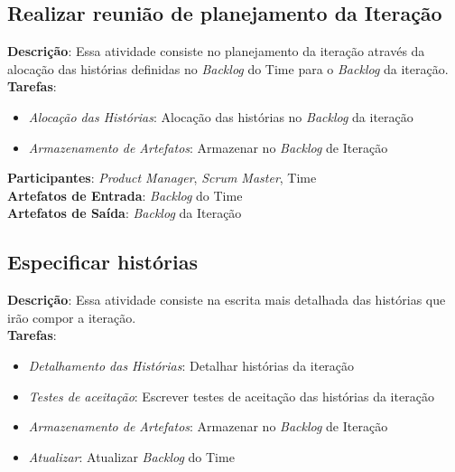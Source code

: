 \subsection{Realizar reunião de planejamento da Iteração}
  \textbf{Descrição}: Essa atividade consiste no planejamento da iteração através da alocação das histórias definidas no \textit{Backlog} do Time para o \textit{Backlog} da iteração. \\

  \textbf{Tarefas}:
  \begin{itemize}
   \item \indent \textit{Alocação das Histórias}: Alocação das histórias no \textit{Backlog} da iteração

   \item \indent \textit{Armazenamento de Artefatos}: Armazenar no \textit{Backlog} de Iteração
  \end{itemize}

  \textbf{Participantes}: \textit{Product Manager}, \textit{Scrum Master}, Time\\

  \textbf{Artefatos de Entrada}: \textit{Backlog} do Time \\

  \textbf{Artefatos de Saída}:  \textit{Backlog} da Iteração\\

\subsection{Especificar histórias}
  \textbf{Descrição}: Essa atividade consiste na escrita mais detalhada das histórias que irão compor a
iteração. \\

  \textbf{Tarefas}:
  \begin{itemize}
   \item \indent \textit{Detalhamento das Histórias}: Detalhar histórias da iteração
   
   \item \indent \textit{Testes de aceitação}: Escrever testes de aceitação das histórias da iteração

   \item \indent \textit{Armazenamento de Artefatos}: Armazenar no \textit{Backlog} de Iteração

   \item \indent \textit{Atualizar}: Atualizar \textit{Backlog} do Time
  \end{itemize}

